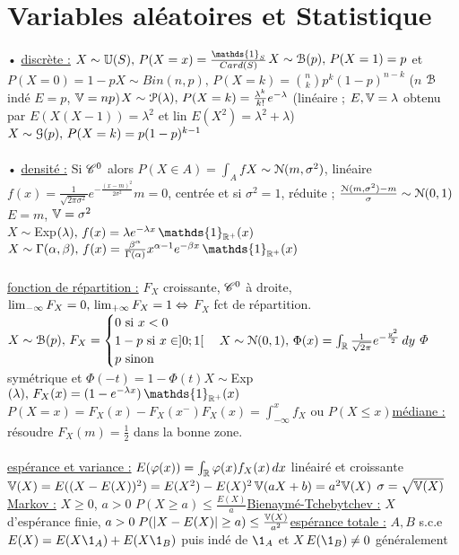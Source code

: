 \documentclass[12 pt]{book}
\begin{document}
\section*{Variables aléatoires et Statistique}
• \underline{discrète :} $X \sim \U(S),\, P(X=x) = \frac{\mathds{1}_S}{Card(S)}$\qquad $X\sim \mathcal{B}(p), \,P(X=1)=p$ et $P(X=0)=1-p$\qquad $X\sim Bin(n,p),\,P(X=k)=\binom{n}{k}p^k(1-p)^{n-k}$ \quad ($n$ $\mathcal{B}$ indé $E=p$, $\mathbb{V}=np$)\qquad $X\sim \mathcal{P}(\lambda),\,P(X=k)=\frac{\lambda^k}{k!}e^{-\lambda}$ \big(linéaire ; $E,\mathbb{V} = \lambda$ obtenu par $E(X(X-1))=\lambda^2$ et lin $E(X^2)=\lambda^2+\lambda$\big)\qquad $X\sim\mathcal{G}(p),\,P(X=k)=p(1-p)^{k-1}$\\
\text{ }\\
• \underline{densité :} Si $\mathscr{C}^0$ alors $P(X\in A) = \int_A f$\qquad $X\sim\mathcal{N}(m,\sigma^2)$, linéaire $f(x)=\frac{1}{\sqrt{2\pi \sigma^2}}e^{-\frac{(x-m)^2}{2\sigma^2}}$\quad $m=0$, centrée et si $\sigma^2=1$, réduite ; $\frac{\mathcal{N}(m,\sigma^2)-m}{\sigma}\sim\mathcal{N}(0,1)$ $E=m$, $\mathbb{V}=\sigma^2$\\
$X\sim$Exp$(\lambda),\,f(x)=\lambda e^{-\lambda x}\,\mathds{1}_{\R^+}(x)$\qquad $X\sim\Gamma(\alpha,\beta),\, f(x)=\frac{\beta^\alpha}{\Gamma(\alpha)}x^{\alpha-1}e^{-\beta x}\,\mathds{1}_{\R^+}(x)$\\
\text{ }\\
\underline{fonction de répartition :} $F_X$ croissante, $\mathscr{C}^0$ à droite, $\lim_{-\infty} F_X =0,\,\lim_{+\infty} F_X =1 \Leftrightarrow$ $F_X$ fct de répartition.\qquad $X\sim\mathcal{B}(p),\, F_X = \begin{cases} 0\text{ si }x<0\\ 1-p\text{ si }x\in]0;1[\\ p\text{ sinon}\\\end{cases}$\qquad $X\sim \mathcal{N}(0,1),\,\Phi(x)=\int_{\mathbb{R}} \frac{1}{\sqrt{2\pi}}e^{-\frac{y^2}{2}}\, dy$ $\Phi$ symétrique et $\Phi(-t)=1-\Phi(t)$\qquad $X\sim$Exp$(\lambda),\, F_X(x)=(1-e^{-\lambda x})\, \mathds{1}_{\R^+}(x)$\\
$P(X=x)=F_X(x) - F_X(x^-)$\qquad $F_X(x)=\int_{-\infty}^x f_X$ ou $P(X\leq x)$\qquad \underline{médiane :} résoudre $F_X(m)=\frac{1}{2}$ dans la bonne zone.\\
\text{ }\\
\underline{espérance et variance :} $E(\varphi(x)) = \int_{\mathbb{R}} \varphi(x)f_X(x)\, dx$ linéairé et croissante\qquad $\mathbb{V}(X)=E((X-E(X))^2)=E(X^2)-E(X)^2$\quad $\mathbb{V}(aX+b)=a^2\mathbb{V}(X)$  $\sigma=\sqrt{\mathbb{V}(X)}$\newline
\underline{Markov :} $X\geq 0$, $a>0$ $P(X\geq a)\leq \frac{E(X)}{a}$\qquad \underline{Bienaymé-Tchebytchev :} $X$ d'espérance finie, $a>0\; P(|X-E(X)|\geq a)\leq\frac{\mathbb{V}(X)}{a^2}$\qquad \underline{espérance totale :} $A,B$ s.c.e $E(X)=E(X\1_A)+E(X\1_B)$ puis indé de $\1_A$ et $X$\quad \warning$\, E(\1_B)\neq 0$ généralement\\
\end{document}
